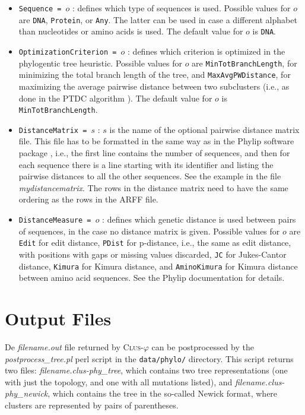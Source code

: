 \documentclass[a4paper]{report}
\newcommand{\clusphy}{\textsc{Clus}-$\varphi$}
\begin{document}
\begin{itemize}
\item {\tt Sequence = $o$} : defines which type of sequences is used. Possible values for $o$ are {\tt DNA}, {\tt Protein}, or {\tt Any}. The latter can be used in case a different alphabet than nucleotides or amino acids is used. The default value for $o$ is {\tt DNA}.
\item {\tt OptimizationCriterion = $o$} : defines which criterion is optimized in the phylogentic tree heuristic. Possible values for $o$ are {\tt MinTotBranchLength}, for minimizing the total branch length of the tree, and {\tt MaxAvgPWDistance}, for maximizing the average pairwise distance between two subclusters (i.e., as done in the PTDC algorithm \cite{Arslan07:proc}). The default value for $o$ is {\tt MinTotBranchLength}.
\item {\tt DistanceMatrix = $s$} : $s$ is the name of the optional pairwise distance matrix file. This file has to be formatted in the same way as in the Phylip software package \cite{Phylip3.6-08:misc}, i.e., the first line contains the number of sequences, and then for each sequence there is a line starting with its identifier and listing the pairwise distances to all the other sequences. See the example in the file \emph{mydistancematrix}. The rows in the distance matrix need to have the same ordering as the rows in the ARFF file.
\item {\tt DistanceMeasure = $o$} : defines which genetic distance is used between pairs of sequences, in the case no distance matrix is given. Possible values for $o$ are {\tt Edit} for edit distance, {\tt PDist} for p-distance, i.e., the same as edit distance, with positions with gaps or missing values discarded, {\tt JC} for Jukes-Cantor distance, {\tt Kimura} for Kimura distance, and {\tt AminoKimura} for Kimura distance between amino acid sequences. See the Phylip documentation \cite{Phylip3.6-08:misc} for details.
\end{itemize}

\section{Output Files}
De \emph{filename.out} file returned by \clusphy{} can be postprocessed by the \emph{postprocess\_tree.pl} perl script in the {\tt data/phylo/} directory. This script returns two files: \emph{filename.clus-phy\_tree}, which contains two tree representations (one with just the topology, and one with all mutations listed), and \emph{filename.clus-phy\_newick}, which contains the tree in the so-called Newick format, where clusters are represented by pairs of parentheses.




\end{document}
